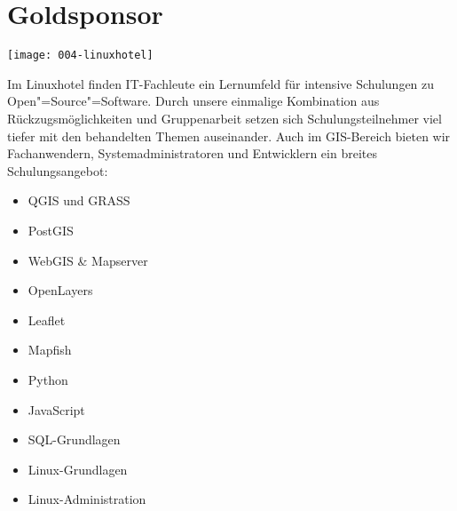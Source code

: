 \section*{Goldsponsor}
\begin{center}
  \texttt{[image: 004-linuxhotel]}
\end{center}
Im Linuxhotel finden IT-Fachleute ein Lernumfeld für intensive Schulungen zu
Open"=Source"=Software. Durch unsere einmalige Kombination aus
Rückzugsmöglichkeiten und Gruppenarbeit setzen sich Schulungsteilnehmer viel
tiefer mit den behandelten Themen auseinander.  Auch im GIS-Bereich bieten wir
Fachanwendern, Systemadministratoren und Entwicklern ein breites
Schulungsangebot:

\begin{itemize}
  \setlength{\itemsep}{-3pt}
  \item QGIS und GRASS
  \item PostGIS
  \item WebGIS \& Mapserver
  \item OpenLayers
  \item Leaflet
  \item Mapfish
  \item Python
  \item JavaScript
  \item SQL-Grundlagen
  \item Linux-Grundlagen
  \item Linux-Administration
\end{itemize}
